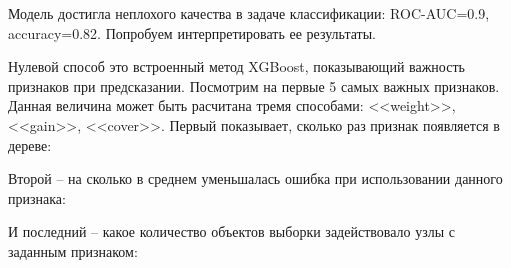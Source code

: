 Модель достигла неплохого качества в задаче классификации: ROC-AUC=0.9, accuracy=0.82. Попробуем интерпретировать ее результаты.

Нулевой способ это встроенный метод XGBoost, показывающий важность признаков при предсказании. Посмотрим на первые 5 самых важных признаков. Данная величина может быть расчитана тремя способами: <<weight>>, <<gain>>, <<cover>>. Первый показывает, сколько раз признак появляется в дереве:

\begin{figure}[h]
\end{figure}

Второй -- на сколько в среднем уменьшалась ошибка при использовании данного признака:

\begin{figure}[h]
\end{figure}

И последний -- какое количество объектов выборки задействовало узлы с заданным признаком:

\begin{figure}[h]
\end{figure}

